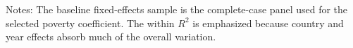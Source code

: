 
\vspace{0.2em}
\begin{minipage}{0.94\textwidth}\scriptsize Notes: The baseline fixed-effects sample is the complete-case panel used for the selected poverty coefficient. The within \(R^2\) is emphasized because country and year effects absorb much of the overall variation.\end{minipage}
